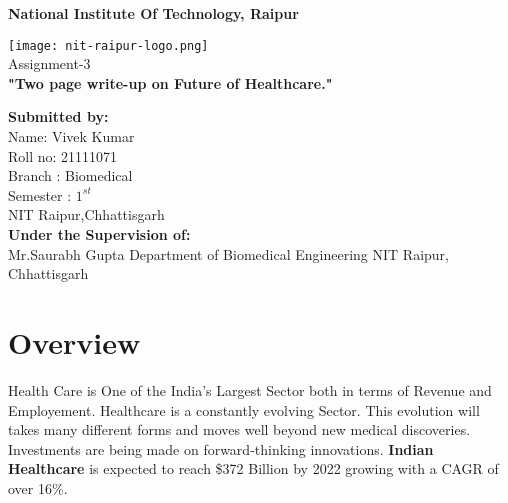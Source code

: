 \documentclass[12pt]{article}
\begin{document}
\pagestyle{empty}



   \begin{center}
       \vspace{1cm}
	   \Large
       \textbf{National Institute Of Technology, Raipur } 
       \vspace{1.5cm}
     
       \texttt{[image: nit-raipur-logo.png]}\\
       \vspace{0.8cm}
       \Huge
       Assignment-3\\
       \vspace{0.8cm}
      \textbf{ "Two page write-up on Future of Healthcare."}
      
	\vfill      
      
   \begin{multicols}{2} 
   \begin{flushleft}
       \large
       \textbf{Submitted by:}\\
       Name: Vivek Kumar\\
       Roll no: 21111071\\
       Branch : Biomedical\\
       Semester : $1^{st}$ \\
       NIT Raipur,Chhattisgarh\\
       \columnbreak
       \textbf{Under the Supervision of:}\\
       Mr.Saurabh Gupta
       Department of Biomedical Engineering
       NIT Raipur, Chhattisgarh
    \end{flushleft}
    \end{multicols}    
            
   \end{center}

\clearpage
\pagestyle{fancy}
\tableofcontents
\clearpage
\section{Overview}
Health Care is One of the India's Largest Sector both in terms of Revenue and Employement. Healthcare is a constantly evolving Sector. This evolution will takes many different forms and moves well beyond new medical discoveries. Investments are being made on forward-thinking innovations.
\textbf{Indian Healthcare} is expected to reach \$372 Billion by 2022 growing with a CAGR of over 16\%.
\end{document}
